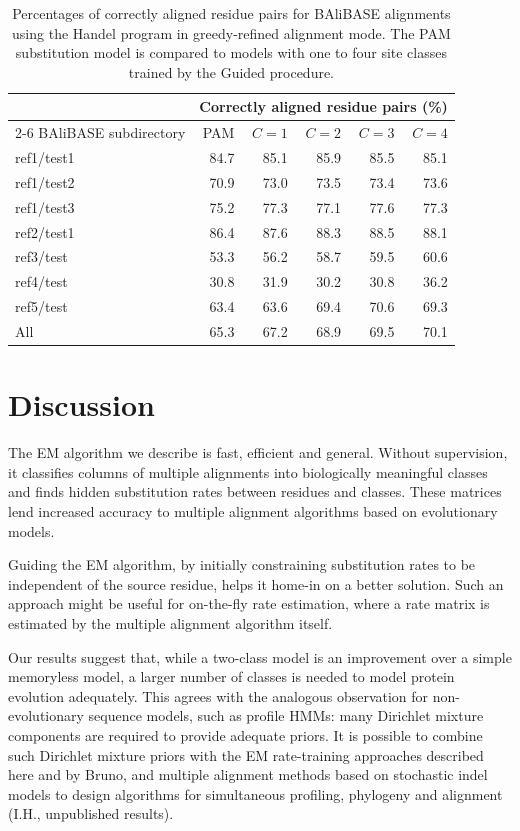 \documentclass[12pt]{article}
\begin{document}
\begin{table}[t]
\centering
\caption{Percentages of correctly aligned residue pairs for BAliBASE alignments using the Handel program in greedy-refined alignment mode. The PAM substitution model is compared to models with one to four site classes trained by the Guided procedure.}
\label{tab:greedy}
\begin{tabular}{lrrrrr}
\toprule
& \multicolumn{5}{c}{Correctly aligned residue pairs (\%)} \\
\cmidrule(l){2-6}
BAliBASE subdirectory & PAM & $C=1$ & $C=2$ & $C=3$ & $C=4$ \\
\midrule
ref1/test1 & 84.7 & 85.1 & 85.9 & 85.5 & 85.1 \\
ref1/test2 & 70.9 & 73.0 & 73.5 & 73.4 & 73.6 \\
ref1/test3 & 75.2 & 77.3 & 77.1 & 77.6 & 77.3 \\
ref2/test1 & 86.4 & 87.6 & 88.3 & 88.5 & 88.1 \\
ref3/test  & 53.3 & 56.2 & 58.7 & 59.5 & 60.6 \\
ref4/test  & 30.8 & 31.9 & 30.2 & 30.8 & 36.2 \\
ref5/test  & 63.4 & 63.6 & 69.4 & 70.6 & 69.3 \\
\midrule
All        & 65.3 & 67.2 & 68.9 & 69.5 & 70.1 \\
\bottomrule
\end{tabular}
\end{table}


\section{Discussion}

The EM algorithm we describe is fast, efficient and general. Without supervision, it classifies
columns of multiple alignments into biologically meaningful classes and finds hidden substitution
rates between residues and classes. These matrices lend increased accuracy to multiple alignment
algorithms based on evolutionary models.

Guiding the EM algorithm, by initially constraining substitution rates to be independent of the
source residue, helps it home-in on a better solution. Such an approach might be useful for
on-the-fly rate estimation, where a rate matrix is estimated by the multiple alignment algorithm
itself.

Our results suggest that, while a two-class model is an improvement over a simple memoryless model,
a larger number of classes is needed to model protein evolution adequately. This agrees with the
analogous observation for non-evolutionary sequence models, such as profile HMMs: many Dirichlet
mixture components are required to provide adequate priors.\cite{Sjolander1996} It is possible to
combine such Dirichlet mixture priors with the EM rate-training approaches described here and by
Bruno,\cite{Bruno1996} and multiple alignment methods based on stochastic indel
models\cite{Holmes2001} to design algorithms for simultaneous profiling, phylogeny and alignment
(I.H., unpublished results).
\end{document}
